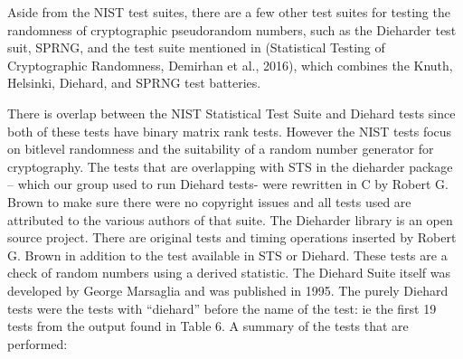 \documentclass[conference]{IEEEtran}
\begin{document}
Aside from the NIST test suites, there are a few other test suites for testing the randomness of cryptographic pseudorandom numbers, such as the Dieharder test suit, SPRNG, and the test suite mentioned in  (Statistical Testing of Cryptographic Randomness, Demirhan et al., 2016), which combines the Knuth, Helsinki, Diehard, and SPRNG test batteries.

There is overlap between the NIST Statistical Test Suite and Diehard tests since both of these tests have binary matrix rank tests. However the NIST tests focus on bitlevel randomness and the suitability of a random number generator for cryptography. The tests that are overlapping with STS in the dieharder package – which our group used to run Diehard tests- were rewritten in C by Robert G. Brown to make sure there were no copyright issues and all tests used are attributed to the various authors of that suite. The Dieharder library is an open source project. There are original tests and timing operations inserted by Robert G. Brown in addition to the test available in STS or Diehard. These tests are a check of random numbers using a derived statistic. The Diehard Suite itself was developed by George Marsaglia and was published in 1995. The purely Diehard tests were the tests with “diehard” before the name of the test: ie the first 19 tests from the output found in Table 6. A summary of the tests that are performed:
\end{document}
